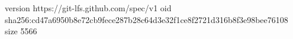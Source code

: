 version https://git-lfs.github.com/spec/v1
oid sha256:cd47a6950b8e72cb9fece287b28c64d3e32f1ce8f2721d316b8f3e98bee76108
size 5566
